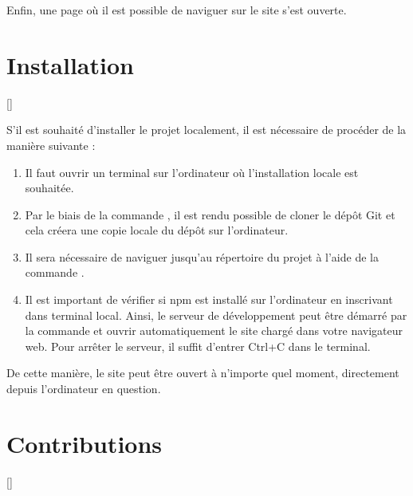 \documentclass[a4,10pt,french]{sphinxmanual}
\begin{document}
\sphinxAtStartPar
Enfin, une page où il est possible de naviguer sur le site s’est ouverte.


\section{Installation}
\label{\detokenize{chapitre-02:installation}}
\sphinxAtStartPar
{[}{]}

\sphinxAtStartPar
S’il est souhaité d’installer le projet localement, il est nécessaire de procéder de la manière suivante :
\begin{enumerate}
%
\item {} 
\sphinxAtStartPar
Il faut ouvrir un terminal sur l’ordinateur où l’installation locale est souhaitée.

\item {} 
\sphinxAtStartPar
Par le biais de la commande , il est rendu possible de cloner le dépôt Git et cela créera une copie locale du dépôt sur l’ordinateur.

\item {} 
\sphinxAtStartPar
Il sera nécessaire de naviguer jusqu’au répertoire du projet à l’aide de la commande .

\item {} 
\sphinxAtStartPar
Il est important de vérifier si npm est installé sur l’ordinateur en inscrivant  dans terminal local. Ainsi, le serveur de développement peut être démarré par la commande  et ouvrir automatiquement le site chargé dans votre navigateur web. Pour arrêter le serveur, il suffit d’entrer Ctrl+C dans le terminal.

\end{enumerate}

\sphinxAtStartPar
De cette manière, le site peut être ouvert à n’importe quel moment, directement depuis l’ordinateur en question.


\section{Contributions}
\label{\detokenize{chapitre-02:contributions}}
\sphinxAtStartPar
{[}{]}
\end{document}
